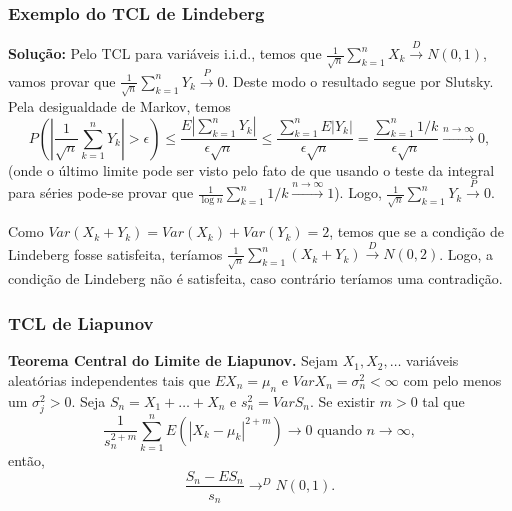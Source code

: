 \begin{frame}
\frametitle{\textbf{Exemplo do TCL de Lindeberg}}
\baselineskip=13pt
\begin{block}{}


{\bf Solução:} Pelo TCL para variáveis i.i.d., temos que $\frac{1}{\sqrt{n}}\sum_{k=1}^{n}X_k\xrightarrow{D}N(0,1)$, vamos provar que $\frac{1}{\sqrt{n}}\sum_{k=1}^{n}Y_k\xrightarrow{P}0$. Deste modo o resultado segue por Slutsky.
Pela desigualdade de Markov, temos
$$P(|\frac{1}{\sqrt{n}}\sum_{k=1}^{n}Y_k|>\epsilon)\leq \frac{E|\sum_{k=1}^{n}Y_k|}{\epsilon\sqrt{n}}\leq \frac{\sum_{k=1}^{n}E|Y_k|}{\epsilon\sqrt{n}}=\frac{\sum_{k=1}^{n}1/k}{\epsilon\sqrt{n}}\xrightarrow{n\rightarrow\infty}0,$$
(onde o último limite pode ser visto pelo fato de que usando o teste da integral para séries pode-se provar que $\frac{1}{\log n}\sum_{k=1}^{n}1/k\xrightarrow{n\rightarrow\infty} 1$). Logo, $\frac{1}{\sqrt{n}}\sum_{k=1}^{n}Y_k\xrightarrow{P}0$.

Como $Var(X_k+Y_k)=Var(X_k)+Var(Y_k)=2$, temos que se a condição de Lindeberg fosse satisfeita, teríamos $\frac{1}{\sqrt{n}}\sum_{k=1}^{n}(X_k+Y_k)\xrightarrow{D}N(0,2)$. Logo, a condição de Lindeberg não é satisfeita, caso contrário teríamos uma contradição.

\end{block}
\end{frame}


\begin{frame}
\frametitle{\textbf{TCL de Liapunov}}


\begin{teo}{\bf Teorema Central do Limite de Liapunov.} Sejam
$X_1,X_2,\ldots$ variáveis aleatórias independentes tais que
$EX_n=\mu_n$ e $Var X_n=\sigma_n^2<\infty$ com pelo menos um
$\sigma_j^2>0$. Seja $S_n=X_1+\ldots+X_n$ e $s_n^2=Var S_n$. Se
existir $m>0$ tal que
$$\frac{1}{s_n^{2+m}}\sum_{k=1}^{n}E(|X_k-\mu_k|^{2+m})\rightarrow 0\mbox{ quando }n\rightarrow\infty,$$
então,
$$\frac{S_n-ES_n}{s_n}\rightarrow^D N(0,1).$$
\end{teo}

\end{frame}

